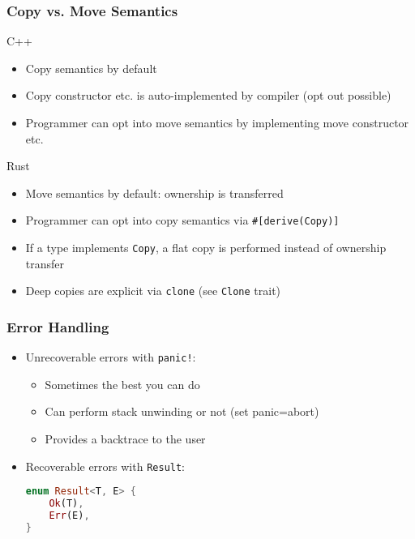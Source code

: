 \begin{frame}[fragile]
    \frametitle{Copy vs. Move Semantics}

    \begin{block}{C++}
        \begin{itemize}
            \item Copy semantics by default
            \item Copy constructor etc. is auto-implemented by compiler (opt out possible)
            \item Programmer can opt into move semantics by implementing move constructor etc.
        \end{itemize}
    \end{block}

    \pause

    \begin{block}{Rust}
        \begin{itemize}
            \item Move semantics by default: ownership is transferred
            \item Programmer can opt into copy semantics via \texttt{\#[derive(Copy)]}
            \item If a type implements \texttt{Copy}, a flat copy is performed instead of ownership transfer
            \item Deep copies are explicit via \texttt{clone} (see \texttt{Clone} trait)
        \end{itemize}
    \end{block}
\end{frame}

\begin{frame}[fragile]
    \frametitle{Error Handling}

    \begin{itemize}
        \item Unrecoverable errors with \texttt{panic!}:
        \begin{itemize}
            \item Sometimes the best you can do
            \item Can perform stack unwinding or not (set panic=abort)
            \item Provides a backtrace to the user
        \end{itemize}

        \pause

        \item Recoverable errors with \texttt{Result}:
        \begin{lstlisting}[language=rust]
enum Result<T, E> {
    Ok(T),
    Err(E),
}
        \end{lstlisting}
    \end{itemize}
\end{frame}

